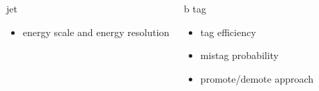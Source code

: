 \begin{frame}{}
    \begin{columns}
        \begin{exampleblock}{jet}
            \begin{itemize} 
            \smaller
                \item energy scale and energy resolution
            \end{itemize}
        \end{exampleblock}

        
        \begin{exampleblock}{b tag}
            \begin{itemize} 
            \smaller
                \item tag efficiency 
                \item mistag probability
                \item promote/demote approach
            \end{itemize}
        \end{exampleblock}
    \end{columns}
\end{frame}


